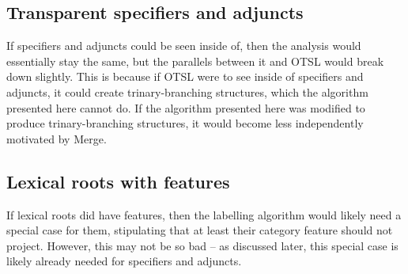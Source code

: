 \subsection{Transparent specifiers and adjuncts}\label{sec:transparent-specifiers}

If specifiers and adjuncts could be seen inside of, then the analysis would essentially stay the same, but the parallels between it and OTSL would break down slightly. This is because if OTSL were to see inside of specifiers and adjuncts, it could create trinary-branching structures, which the algorithm presented here cannot do. If the algorithm presented here was modified to produce trinary-branching structures, it would become less independently motivated by Merge.

\subsection{Lexical roots with features}\label{sec:roots-with-features}

If lexical roots did have features, then the labelling algorithm would likely need a special case for them, stipulating that at least their category feature should not project. However, this may not be so bad -- as discussed later, this special case is likely already needed for specifiers and adjuncts.
